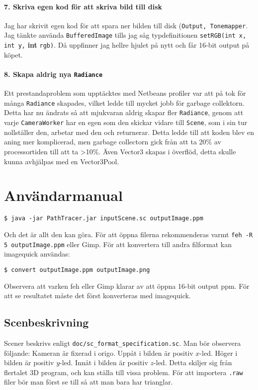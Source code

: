 \documentclass{article}
\begin{document}
\paragraph{7. Skriva egen kod för att skriva bild till disk}
Jag har skrivit egen kod för att spara ner bilden till disk
(\texttt{Output, Tonemapper}. Jag tänkte använda
\texttt{BufferedImage} tills jag såg typdefinitionen
\texttt{setRGB(int x, int y,} \textbf{int} \texttt{rgb)}. Då uppfinner
jag hellre hjulet på nytt och får 16-bit output på köpet.

\paragraph{8. Skapa aldrig nya \texttt{Radiance}}
Ett prestandaproblem som upptäcktes med Netbeans profiler var att på
tok för många \texttt{Radiance} skapades, vilket ledde till mycket
jobb för garbage collektorn. Detta har nu ändrats så att mjukvaran
aldrig skapar fler \texttt{Radiance}, genom att varje
\texttt{CameraWorker} har en egen som den skickar vidare till
\texttt{Scene}, som i sin tur nollställer den, arbetar med den och
returnerar. Detta ledde till att koden blev en aning mer komplicerad,
men garbage collectorn gick från att ta 20\% av processortiden till
att ta >10\%. Även Vector3 skapas i överflöd, detta skulle kunna
avhjälpas med en Vector3Pool.

\section{Användarmanual}
\begin{verbatim}
$ java -jar PathTracer.jar inputScene.sc outputImage.ppm
\end{verbatim}
Och det är allt den kan göra. För att öppna filerna rekommenderas
varmt \texttt{feh -R 5 outputImage.ppm} eller Gimp. För att konvertera
till andra filformat kan imagequick användas:
\begin{verbatim}
$ convert outputImage.ppm outputImage.png
\end{verbatim}
Observera att varken feh eller Gimp klarar av att öppna 16-bit output
ppm. För att se resultatet måste det först konverteras med imagequick.

\subsection{Scenbeskrivning}
Scener beskrivs enligt \texttt{doc/sc\_format\_specification.sc}. Man
bör observera följande: Kameran är fixerad i origo. Uppåt i bilden är
positiv $x$-led. Höger i bilden är positiv $y$-led. Innåt i bilden är
positiv $z$-led. Detta skiljer sig från flertalet 3D program, och kan
ställa till vissa problem. För att importera \texttt{.raw} filer bör
man först se till så att man bara har trianglar.
\end{document}
